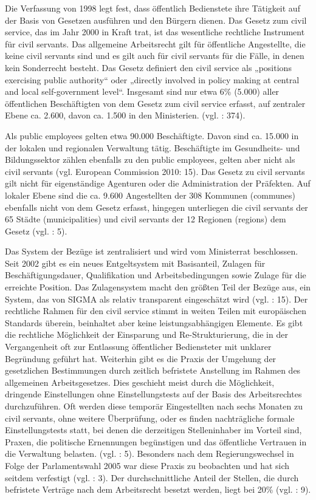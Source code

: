 Die Verfassung von 1998 legt fest, dass öffentlich Bedienstete ihre Tätigkeit auf der Basis von Gesetzen ausführen und den Bürgern dienen. Das Gesetz zum civil service, das im Jahr 2000 in Kraft trat, ist das wesentliche rechtliche Instrument für civil servants. Das allgemeine Arbeitsrecht gilt für öffentliche Angestellte, die keine civil servants sind und es gilt auch für civil servants für die Fälle, in denen kein Sonderrecht besteht. Das Gesetz definiert den civil service als „positions exercising public authority“ oder „directly involved in policy making at central and local self-government level“. Insgesamt sind nur etwa 6\% (5.000) aller öffentlichen Beschäftigten von dem Gesetz zum civil service erfasst, auf zentraler Ebene ca. 2.600, davon ca. 1.500 in den Ministerien. (vgl. \cite{skarica} : 374).\par
Als public employees gelten etwa 90.000 Beschäftigte. Davon sind ca. 15.000 in der lokalen und regionalen Verwaltung tätig. Beschäftigte im Gesundheits- und Bildungssektor zählen ebenfalls zu den public employees, gelten aber nicht als civil servants (vgl. European Commission 2010: 15). Das Gesetz zu civil servants gilt nicht für eigenständige Agenturen oder die Administration der Präfekten. Auf lokaler Ebene sind die ca. 9.600 Angestellten der 308 Kommunen (communes) ebenfalls nicht von dem Gesetz erfasst, hingegen unterliegen die civil servants der 65 Städte (municipalities) und civil servants der 12 Regionen (regions) dem Gesetz (vgl. \cite{oecd09} : 5).\par
Das System der Bezüge ist zentralisiert und wird vom Ministerrat beschlossen. Seit 2002 gibt es ein neues Entgeltsystem mit Basisanteil, Zulagen für Beschäftigungsdauer, Qualifikation und Arbeitsbedingungen sowie Zulage für die erreichte Position. Das Zulagensystem macht den größten Teil der Bezüge aus, ein System, das von SIGMA als relativ transparent eingeschätzt wird (vgl.  \cite{oecd09} : 15). Der rechtliche Rahmen für den civil service stimmt in weiten Teilen mit europäischen Standards überein, beinhaltet aber keine leistungsabhängigen Elemente. Es gibt die rechtliche Möglichkeit der Einsparung und Re-Strukturierung, die in der Vergangenheit oft zur Entlassung öffentlicher Bediensteter mit unklarer Begründung geführt hat. Weiterhin gibt es die Praxis der Umgehung der gesetzlichen Bestimmungen durch zeitlich befristete Anstellung im Rahmen des allgemeinen Arbeitsgesetzes. Dies geschieht meist durch die Möglichkeit, dringende Einstellungen ohne Einstellungstests auf der Basis des Arbeitsrechtes durchzuführen. Oft werden diese temporär Eingestellten nach sechs Monaten zu civil servants, ohne weitere Überprüfung, oder es finden nachträgliche formale Einstellungstests statt, bei denen die derzeitigen Stelleninhaber im Vorteil sind, Praxen, die politische Ernennungen begünstigen und das öffentliche Vertrauen in die Verwaltung belasten. (vgl. \cite{oecd11a} : 5). Besonders nach dem Regierungswechsel in Folge der Parlamentswahl 2005 war diese Praxis zu beobachten und hat sich seitdem verfestigt (vgl.  \cite{oecd09} : 3). Der durchschnittliche Anteil der Stellen, die durch befristete Verträge nach dem Arbeitsrecht besetzt werden, liegt bei 20\% (vgl. \cite{eurcom09b} : 9).\par

